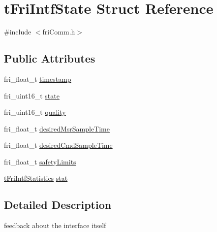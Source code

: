 \hypertarget{structtFriIntfState}{\section{t\-Fri\-Intf\-State \-Struct \-Reference}
\label{structtFriIntfState}
}


{\ttfamily \#include $<$fri\-Comm.\-h$>$}

\subsection*{\-Public \-Attributes}
\begin{DoxyCompactItemize}
\item 
fri\-\_\-float\-\_\-t \hyperlink{structtFriIntfState_a327be107aefb5b34ee67706ebae192ff}{timestamp}
\item 
fri\-\_\-uint16\-\_\-t \hyperlink{structtFriIntfState_a690159bffb5c3290f19e1369fd68b403}{state}
\item 
fri\-\_\-uint16\-\_\-t \hyperlink{structtFriIntfState_acfb16eec860cf8908d6d6fc2009a7061}{quality}
\item 
fri\-\_\-float\-\_\-t \hyperlink{structtFriIntfState_ae1520116a2c17e7d701786c0524508a3}{desired\-Msr\-Sample\-Time}
\item 
fri\-\_\-float\-\_\-t \hyperlink{structtFriIntfState_a47568e63ea7211bcd31141dfeb5f91ef}{desired\-Cmd\-Sample\-Time}
\item 
fri\-\_\-float\-\_\-t \hyperlink{structtFriIntfState_ad3172f366c6c805a5c196796de78eaa6}{safety\-Limits}
\item 
\hyperlink{structtFriIntfStatistics}{t\-Fri\-Intf\-Statistics} \hyperlink{structtFriIntfState_ad0a01c6520f016a648836da5ed4beacd}{stat}
\end{DoxyCompactItemize}


\subsection{\-Detailed \-Description}
feedback about the interface itself 

